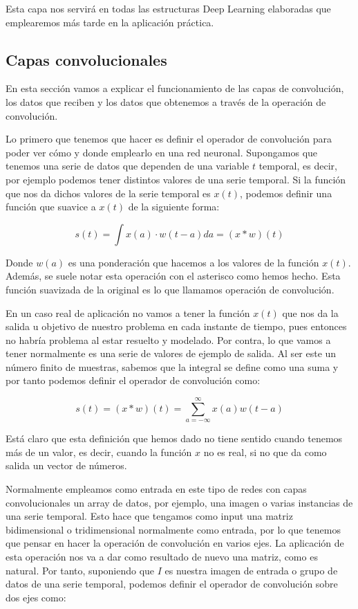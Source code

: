 Esta capa nos servirá en todas las estructuras Deep Learning elaboradas que emplearemos más tarde en la aplicación práctica.

\subsection{Capas convolucionales}

En esta sección vamos a explicar el funcionamiento de las capas de convolución, los datos que reciben y los datos que obtenemos a través de la operación de convolución.

Lo primero que tenemos que hacer es definir el operador de convolución para poder ver cómo y donde emplearlo en una red neuronal. Supongamos que tenemos una serie de datos que dependen de una variable $t$ temporal, es decir, por ejemplo podemos tener distintos valores de una serie temporal. Si la función que nos da dichos valores de la serie temporal es $x(t)$, podemos definir una función que suavice a $x(t)$ de la siguiente forma:

$$s(t) = \int x(a)\cdot w(t-a) da = (x * w)(t)$$

Donde $w(a)$ es una ponderación que hacemos a los valores de la función $x(t)$. Además, se suele notar esta operación con el asterisco como hemos hecho. Esta función suavizada de la original es lo que llamamos operación de convolución.

En un caso real de aplicación no vamos a tener la función $x(t)$ que nos da la salida u objetivo de nuestro problema en cada instante de tiempo, pues entonces no habría problema al estar resuelto y modelado. Por contra, lo que vamos a tener normalmente es una serie de valores de ejemplo de salida. Al ser este un número finito de muestras, sabemos que la integral se define como una suma y por tanto podemos definir el operador de convolución como:

$$s(t) = (x*w)(t) = \sum_{a=-\infty}^{\infty}x(a)w(t-a)$$

Está claro que esta definición que hemos dado no tiene sentido cuando tenemos más de un valor, es decir, cuando la función $x$ no es real, si no que da como salida un vector de números.

Normalmente empleamos como entrada en este tipo de redes con capas convolucionales un array de datos, por ejemplo, una imagen o varias instancias de una serie temporal. Esto hace que tengamos como input una matriz bidimensional o tridimensional normalmente como entrada, por lo que tenemos que pensar en hacer la operación de convolución en varios ejes. La aplicación de esta operación nos va a dar como resultado de nuevo una matriz, como es natural. Por tanto, suponiendo que $I$ es nuestra imagen de entrada o grupo de datos de una serie temporal, podemos definir el operador de convolución sobre dos ejes como:

